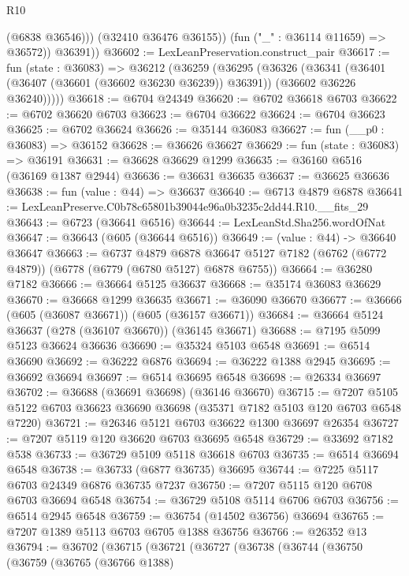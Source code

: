 \begin{lexlean}{R10}
\begin{coremodule}
                (@6838 @36546)))
            (@32410 @36476 @36155))
          (fun ("_" : @36114 @11659) => @36572))
        @36391))
@36602 := LexLeanPreservation.construct_pair
@36617 := fun (state : @36083) =>
  @36212
    (@36259
      (@36295
        (@36326
          (@36341
            (@36401 (@36407 (@36601 (@36602 @36230 @36239)) @36391))
            (@36602 @36226 @36240)))))
@36618 := @6704 @24349
@36620 := @6702 @36618 @6703
@36622 := @6702 @36620 @6703
@36623 := @6704 @36622
@36624 := @6704 @36623
@36625 := @6702 @36624
@36626 := @35144 @36083
@36627 := fun (__p0 : @36083) => @36152
@36628 := @36626 @36627
@36629 := fun (state : @36083) => @36191
@36631 := @36628 @36629 @1299
@36635 := @36160 @6516 (@36169 @1387 @2944)
@36636 := @36631 @36635
@36637 := @36625 @36636
@36638 := fun (value : @44) => @36637
@36640 := @6713 @4879 @6878
@36641 := LexLeanPreserve.C0b78c65801b39044e96a0b3235c2dd44.R10.__fits_29
@36643 := @6723 (@36641 @6516)
@36644 := LexLeanStd.Sha256.wordOfNat
@36647 := @36643 (@605 (@36644 @6516))
@36649 := (value : @44) -> @36640 @36647
@36663 := @6737
    @4879
    @6878
    @36647
    @5127
    @7182
    (@6762 (@6772 @4879))
    (@6778 (@6779 (@6780 @5127) @6878 @6755))
@36664 := @36280 @7182
@36666 := @36664 @5125 @36637
@36668 := @35174 @36083 @36629
@36670 := @36668 @1299 @36635
@36671 := @36090 @36670
@36677 := @36666 (@605 (@36087 @36671)) (@605 (@36157 @36671))
@36684 := @36664 @5124 @36637 (@278 (@36107 @36670)) (@36145 @36671)
@36688 := @7195 @5099 @5123 @36624 @36636
@36690 := @35324 @5103 @6548
@36691 := @6514 @36690
@36692 := @36222 @6876
@36694 := @36222 @1388 @2945
@36695 := @36692 @36694
@36697 := @6514 @36695 @6548
@36698 := @26334 @36697
@36702 := @36688 (@36691 @36698) (@36146 @36670)
@36715 := @7207 @5105 @5122 @6703 @36623 @36690 @36698 (@35371 @7182 @5103 @120 @6703 @6548 @7220)
@36721 := @26346 @5121 @6703 @36622 @1300 @36697 @26354
@36727 := @7207 @5119 @120 @36620 @6703 @36695 @6548
@36729 := @33692 @7182 @538
@36733 := @36729 @5109 @5118 @36618 @6703
@36735 := @6514 @36694 @6548
@36738 := @36733 (@6877 @36735) @36695
@36744 := @7225 @5117 @6703 @24349 @6876 @36735 @7237
@36750 := @7207 @5115 @120 @6708 @6703 @36694 @6548
@36754 := @36729 @5108 @5114 @6706 @6703
@36756 := @6514 @2945 @6548
@36759 := @36754 (@14502 @36756) @36694
@36765 := @7207 @1389 @5113 @6703 @6705 @1388 @36756
@36766 := @26352 @13
@36794 := @36702
    (@36715
      (@36721
        (@36727
          (@36738
            (@36744
              (@36750
                (@36759
                  (@36765
                    (@36766 @1388)

\end{coremodule}
\end{lexlean}
